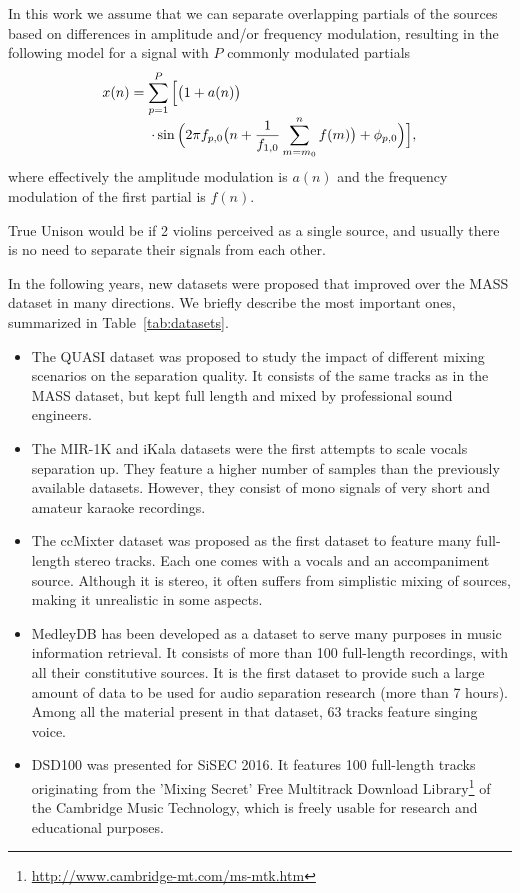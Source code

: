 In this work we assume that we can separate overlapping partials of the sources based on differences in amplitude and/or frequency modulation, resulting in the following model for a signal with $P$ commonly modulated partials
\begin{equation}
  \begin{array}{l}
   x(n) = \displaystyle \sum_{p=1}^{P} \Big[\big(1 + a(n)\big) \\
   \hspace{3.5em}\displaystyle \cdot\sin \Big(2\pi f_{p,0}\big(n + \frac{1}{f_{1,0}} \sum_{m=m_0}^{n}{f(m)} \big) + \phi_{p,0} \Big)\Big] ,
  \end{array}
\end{equation}
where effectively the amplitude modulation is $a(n)$ and the frequency modulation of the first partial is $f(n)$.

True Unison would be if 2 violins perceived as a single source, and usually there is no need to separate their signals from each other.

In the following years, new datasets were proposed that improved over the MASS dataset in many directions. We briefly describe the most important ones, summarized in Table~\ref{tab:datasets}.
\begin{itemize}[leftmargin=*]
	\item The QUASI dataset was proposed to study the impact of different mixing scenarios on the separation quality. It  consists of the same tracks as in the MASS dataset, but kept full length and mixed by professional sound engineers.
	\item The MIR-1K and iKala datasets were the first attempts to scale vocals separation up. They feature a higher number of samples than the previously available datasets. However, they consist of mono signals of very short and amateur karaoke recordings.
	\item The ccMixter dataset was proposed as the first dataset to feature many full-length stereo tracks. Each one comes with a vocals and an accompaniment source. Although it is stereo, it often suffers from simplistic mixing of sources, making it unrealistic in some aspects.
	\item MedleyDB has been developed as a dataset to serve many purposes in music information retrieval. It consists of more than 100 full-length recordings, with all their constitutive sources. It is the first dataset to provide such a large amount of data to be used for audio separation research (more than 7 hours). Among all the material present in that dataset, 63 tracks feature singing voice.
  \item DSD100 was presented for SiSEC 2016. It features 100 full-length tracks originating from the 'Mixing Secret' Free Multitrack Download Library\footnote{\url{http://www.cambridge-mt.com/ms-mtk.htm}} of the Cambridge Music Technology, which is freely usable for research and educational purposes.
\end{itemize}

